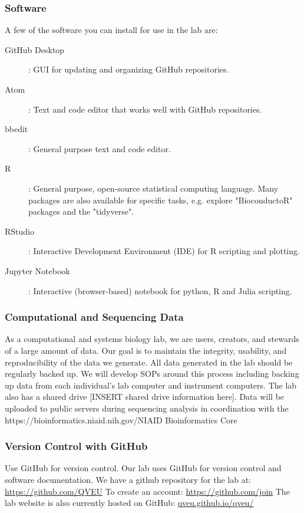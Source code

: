 \documentclass[10pt, a4paper, twocolumn]{article} %
\begin{document}
\subsubsection{Software}
A few of the software you can install for use in the lab are:
\begin{description}
\item [GitHub Desktop]: GUI for updating and organizing GitHub repositories.
\item [Atom]: Text and code editor that works well with GitHub repositories.
\item [bbedit]: General purpose text and code editor.
\item [R]: General purpose, open-source statistical computing language. Many packages are also available for specific tasks, e.g. explore "BioconductoR" packages and the "tidyverse".
\item [RStudio]: Interactive Development Environment (IDE) for R scripting and plotting.
\item [Jupyter Notebook]: Interactive (browser-based) notebook for python, R and Julia scripting.
\end{description}
\subsubsection{Computational and Sequencing Data}
As a computational and systems biology lab, we are users, creators, and stewards of a large amount of data. Our goal is to maintain the integrity, usability, and reproducibility of the data we generate. All data generated in the lab should be regularly backed up. We will develop SOPs around this process including backing up data from each individual's lab computer and instrument computers. The lab also has a shared drive [INSERT shared drive information here]. Data will be uploaded to public servers during sequencing analysis in coordination with the {https://bioinformatics.niaid.nih.gov/}{NIAID Bioinformatics Core}

\subsubsection{Version Control with GitHub}
Use GitHub for version control. Our lab uses GitHub for version control and software documentation. We have a github repository for the lab at: \href{https://github.com/QVEU}{https://github.com/QVEU}
To create an account: \href{https://github.com/join}{https://github.com/join}
The lab website is also currently hosted on GitHub: \href{https://qveu.github.io/QVEU/}{qveu.github.io/qveu/}
\end{document}

